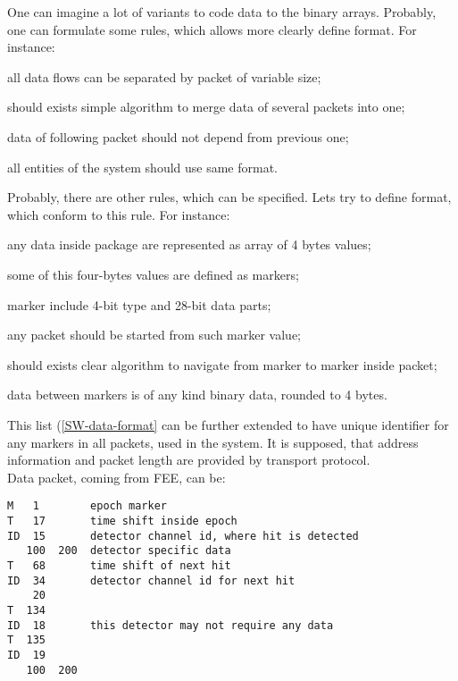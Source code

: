One can imagine a lot of variants to code data to the binary arrays.
Probably, one can formulate some rules, which allows more clearly define format. For instance:
\begin{compactitem}[$\bullet$]
\item all data flows can be separated by packet of variable size;
\item should exists simple algorithm to merge data of several packets into one;
\item data of following packet should not depend from previous one;
\item all entities of the system should use same format.
\end{compactitem}
Probably, there are other rules, which can be specified.
Lets try to define format, which conform to this rule. For instance:
\begin{compactitem}[$\bullet$]
\item any data inside package are represented as array of 4 bytes values;
\item some of this four-bytes values are defined as markers;
\item marker include 4-bit type and 28-bit data parts;
\item any packet should be started from such marker value;
\item should exists clear algorithm to navigate from marker to marker inside packet;
\item data between markers is of any kind binary data, rounded to 4 bytes.
\end{compactitem}

This list (\ref{SW-data-format} can be further extended to have unique identifier for any markers in all packets,
used in the system. It is supposed, that address information and packet length are provided
by transport protocol.\\
Data packet, coming from FEE, can be:
\begin{verbatim}
M   1        epoch marker
T   17       time shift inside epoch
ID  15       detector channel id, where hit is detected
   100  200  detector specific data
T   68       time shift of next hit
ID  34       detector channel id for next hit
    20
T  134
ID  18       this detector may not require any data
T  135
ID  19
   100  200
\end{verbatim}
